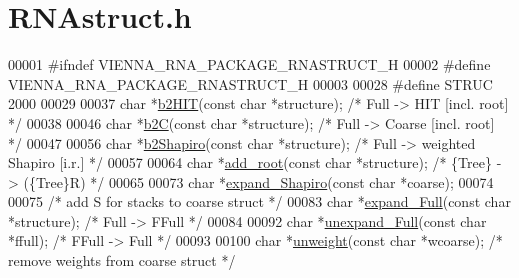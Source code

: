 \hypertarget{RNAstruct_8h_source}{\section{R\+N\+Astruct.\+h}
\label{RNAstruct_8h_source}
}

\begin{DoxyCode}
00001 \textcolor{preprocessor}{#ifndef VIENNA\_RNA\_PACKAGE\_RNASTRUCT\_H}
00002 \textcolor{preprocessor}{#define VIENNA\_RNA\_PACKAGE\_RNASTRUCT\_H}
00003 
00028 \textcolor{preprocessor}{#define STRUC     2000}
00029 
00037 \textcolor{keywordtype}{char} *\hyperlink{group__struct__utils_ga07b7e90e712559a1992fba3ac6d21bbd}{b2HIT}(\textcolor{keyword}{const} \textcolor{keywordtype}{char} *structure);             \textcolor{comment}{/* Full   -> HIT    [incl. root] */}
00038 
00046 \textcolor{keywordtype}{char} *\hyperlink{group__struct__utils_ga9c80d92391f2833549a8b6dac92233f0}{b2C}(\textcolor{keyword}{const} \textcolor{keywordtype}{char} *structure);               \textcolor{comment}{/* Full   -> Coarse [incl. root] */}
00047 
00056 \textcolor{keywordtype}{char} *\hyperlink{group__struct__utils_ga5cd2feb367feeacad0c03cb7ddba5f10}{b2Shapiro}(\textcolor{keyword}{const} \textcolor{keywordtype}{char} *structure);         \textcolor{comment}{/* Full -> weighted Shapiro [i.r.] */}
00057 
00064 \textcolor{keywordtype}{char} *\hyperlink{group__struct__utils_ga880d33066dd95441e5fbb73c57ed1c3e}{add\_root}(\textcolor{keyword}{const} \textcolor{keywordtype}{char} *structure);                   \textcolor{comment}{/* \{Tree\} -> (\{Tree\}R)          */}
00065 
00073 \textcolor{keywordtype}{char}  *\hyperlink{group__struct__utils_gabe3d815b420dc4553bfb23511198b4c6}{expand\_Shapiro}(\textcolor{keyword}{const} \textcolor{keywordtype}{char} *coarse);
00074 
00075 \textcolor{comment}{/* add S for stacks to coarse struct */}
00083 \textcolor{keywordtype}{char}  *\hyperlink{group__struct__utils_ga78d73cd54a068ef2812812771cdddc6f}{expand\_Full}(\textcolor{keyword}{const} \textcolor{keywordtype}{char} *structure);      \textcolor{comment}{/* Full   -> FFull         */}
00084 
00092 \textcolor{keywordtype}{char}  *\hyperlink{group__struct__utils_ga260c4b622093b76a883bf96628280de1}{unexpand\_Full}(\textcolor{keyword}{const} \textcolor{keywordtype}{char} *ffull);        \textcolor{comment}{/* FFull  -> Full          */}
00093 
00100 \textcolor{keywordtype}{char}  *\hyperlink{group__struct__utils_ga09a80253ac7b6bae606871ba7c6e5136}{unweight}(\textcolor{keyword}{const} \textcolor{keywordtype}{char} *wcoarse);           \textcolor{comment}{/* remove weights from coarse struct */}

\end{DoxyCode}
